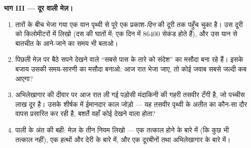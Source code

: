\begin{problem}
\medskip\noindent\textbf{भाग III --- दूर वाली मेज़।}
\begin{enumerate}[resume]
  \item तारों के बीच भेजा गया एक यान पृथ्वी से पूरे एक प्रकाश-\emph{दिन}
        की दूरी तक पहुँच चुका है। उस दूरी को किलोमीटरों में लिखो (दस
        की घातों में; एक दिन में $86400$ सेकंड होते हैं), और उस यान
        से बातचीत के आने-जाने का समय भी बताओ।
  \item पिछली मेज़ पर बैठे सपने देखने वाले ``सबसे पास के तारे को
        संदेश'' का मसौदा बना रहे हैं। इसके बजाय उसकी समय-सारणी का
        मसौदा बनाओ: आज रात भेजा जाए, तो कोई जवाब सबसे जल्दी कब आएगा?
  \item अभिलेखागार की दीवार पर आज रात ली गई पड़ोसी मंदाकिनी की गहरी
        तसवीर टँगी है, जो पच्चीस लाख  दूर है। उसके शीर्षक
        में ईमानदार काल जोड़ो --- यह तसवीर पृथ्वी के अतीत का कौन-सा
        दौर वापस प्रसारित कर रही है, बशर्ते वहाँ कोई देखने वाला होता?
  \item पाली के अंत की बही: मेज़ के तीन नियम लिखो --- एक तत्काल होने
        के बारे में (कि कुछ भी तत्काल नहीं), एक हत्थों और देरी के
        बारे में, और एक दूरबीनों तथा अभिलेखागार के बारे में।
\end{enumerate}
\end{problem}
